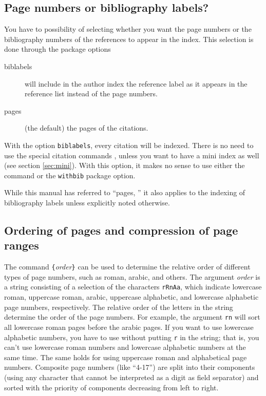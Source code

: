 \documentclass[a4paper]{article}
\newcommand{\ltxinp}[1]{\texttt{\string#1}}
\begin{document}
\subsection{Page numbers or bibliography labels?}

You have to possibility of selecting whether you want the page numbers or the
bibliography numbers of the references to appear in the index. This selection
is done through the package options
\begin{description}
\item[biblabels] will include in the author index the reference label as it
  appears in the reference list instead of the page numbers.
\item[pages] (the default) the pages of the citations.
\end{description}
With the option \ltxinp{biblabels}, every citation will be indexed. There is no
need to use the special citation commands \ltxinp{\aicite}, unless you want to
have a mini index as well (see section \ref{sec:mini}).  With this option, it
makes no sense to use either the \ltxinp{\aimention} command or the
\ltxinp{withbib} package option.

While this manual has referred to ``pages, '' it also applies to the indexing
of bibliography labels unless explicitly noted otherwise.


\subsection{Ordering of pages and compression of page ranges}

The command \ltxinp{\aipagetypeorder}\verb|{|\textsl{order\/}\verb|}| can be
used to determine the relative order of different types of page numbers, such
as roman, arabic, and others. The argument \textsl{order\/} is a string
consisting of a selection of the characters \ltxinp{rRnAa}, which indicate
lowercase roman, uppercase roman, arabic, uppercase alphabetic, and lowercase
alphabetic page numbers, respectively. The relative order of the letters in the
string determine the order of the page numbers. For example, the argument
\ltxinp{rn} will sort all lowercase roman pages before the arabic pages. If you
want to use lowercase alphabetic numbers, you have to use
\ltxinp{\aipagetypeorder} without putting \ltxinp{r} in the string; that is,
you can't use lowercase roman numbers and lowercase alphabetic numbers at the
same time. The same holds for using uppercase roman and alphabetical page
numbers. Composite page numbers (like ``4-17'') are split into their components
(using any character that cannot be interpreted as a digit as field separator)
and sorted with the priority of components decreasing from left to right.
\end{document}
